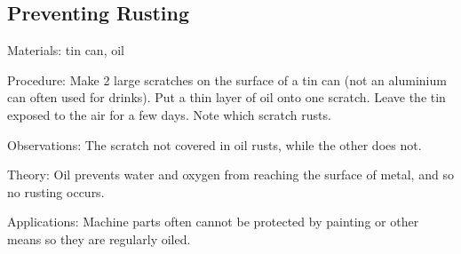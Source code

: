 \begin{multicols}{2}
\subsection{Preventing Rusting} %


\begin{description*}
\item[Materials:]{tin can, oil}
\item[Procedure:]{Make 2 large scratches on the surface of a tin can (not an aluminium
can often used for drinks). Put a thin layer of oil onto one scratch.
Leave the tin exposed to the air for a few days. Note which scratch
rusts.}
\item[Observations:]{The scratch not covered in oil rusts, while the other does not.}
\item[Theory:]{Oil prevents water and oxygen from reaching the surface of metal, and so no rusting occurs.}
\item[Applications:]{Machine parts often cannot be protected by painting or other means so they are regularly oiled.}
\end{description*}



\end{multicols}

\pagebreak